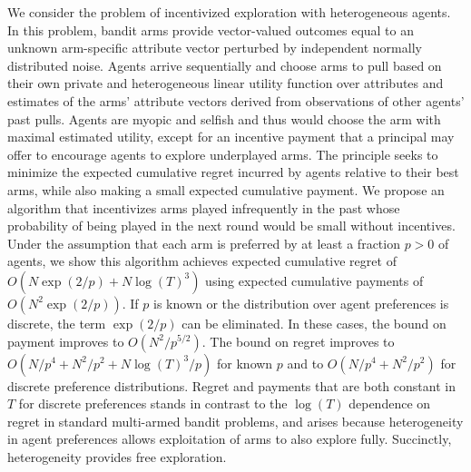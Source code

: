 We consider the problem of incentivized exploration with heterogeneous agents.
In this problem, bandit arms provide vector-valued outcomes equal to an unknown
arm-specific attribute vector perturbed by independent normally distributed
noise.  Agents arrive sequentially and choose arms to pull based on their own
private and heterogeneous linear utility function over attributes and estimates
of the arms' attribute vectors derived from observations of other agents' past
pulls.  Agents are myopic and selfish and thus would choose the arm with
maximal estimated utility, except for an incentive payment that a principal may
offer to encourage agents to explore underplayed arms.  The principle seeks to
minimize the expected cumulative regret incurred by agents relative to their
best arms, while also making a small expected cumulative payment.  We propose
an algorithm that incentivizes arms played infrequently in the
past whose probability of being played in the next round would be small
without incentives.  Under the assumption that each arm is preferred by at
least a fraction $p>0$ of agents, we show this algorithm achieves expected
cumulative regret of $O(N\exp(2/p) + N \log(T)^3)$ using expected cumulative
payments of $O(N^2 \exp(2/p))$.  If $p$ is known or the distribution over agent
preferences is discrete, the term $\exp(2/p)$ can be eliminated.  In these
cases, the bound on payment improves to $O(N^2 / p^{5/2})$.  The bound on
regret improves to $O(N/p^4 + N^2/p^2 + N \log(T)^3 / p)$ for known $p$ and to
$O(N/p^4 + N^2/p^2)$ for discrete preference distributions.  Regret and
payments that are both constant in $T$ for discrete preferences stands
in contrast to the $\log(T)$ dependence on regret in standard multi-armed bandit
problems, and arises because heterogeneity in agent preferences allows
exploitation of arms to also explore fully.
Succinctly, heterogeneity provides free exploration.
